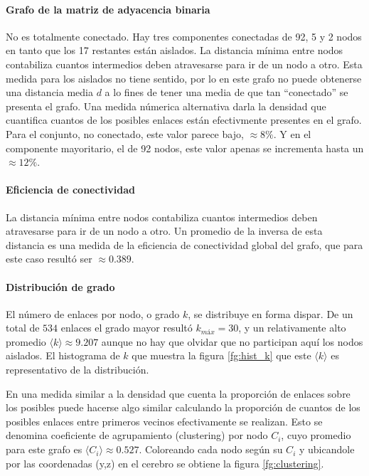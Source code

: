 \documentclass{article}
\begin{document}
\paragraph{Grafo de la matriz de adyacencia binaria}
No es totalmente conectado. Hay tres componentes conectadas de 92, 5 y 2 nodos en tanto que los 17 restantes están aislados.
La distancia mínima entre nodos contabiliza cuantos intermedios deben atravesarse para ir de un nodo a otro.
Esta medida para los aislados no tiene sentido, por lo en este grafo no puede obtenerse una distancia media $d$ a lo fines de tener una media de que tan ``conectado'' se presenta el grafo.
Una medida númerica alternativa darla la densidad que cuantifica cuantos de los posibles enlaces están efectivmente presentes en el grafo.
Para el conjunto, no conectado, este valor parece bajo, $\approx 8\%$.
Y en el componente mayoritario, el de 92 nodos, este valor apenas se incrementa hasta un $\approx 12\%$. 


\paragraph{Eficiencia de conectividad}
La distancia mínima entre nodos contabiliza cuantos intermedios deben atravesarse para ir de un nodo a otro.
Un promedio de la inversa de esta distancia es una medida de la eficiencia de conectividad global del grafo, que para este caso resultó ser $\approx 0.389$.


\paragraph{Distribución de grado}
El número de enlaces por nodo, o grado $k$, se distribuye en forma dispar.
De un total de $534$ enlaces el grado mayor resultó $k_{máx} = 30$, y un relativamente alto promedio $\langle k \rangle \approx 9.207$ aunque no hay que olvidar que no participan aquí los nodos aislados.
El histograma de $k$ que muestra la figura \ref{fg:hist_k} que este $\langle k \rangle$ es representativo de la distribución.

En una medida similar a la densidad que cuenta la proporción de enlaces sobre los posibles puede hacerse algo similar calculando la proporción de cuantos de los posibles enlaces entre primeros vecinos efectivamente se realizan.
Esto se denomina coeficiente de agrupamiento (clustering) por nodo $C_i$, cuyo promedio para este grafo es $\langle C_i \rangle \approx 0.527$. 
Coloreando cada nodo según su $C_i$ y ubicandole por las coordenadas (y,z) en el cerebro se obtiene la figura \ref{fg:clustering}. 
\end{document}
